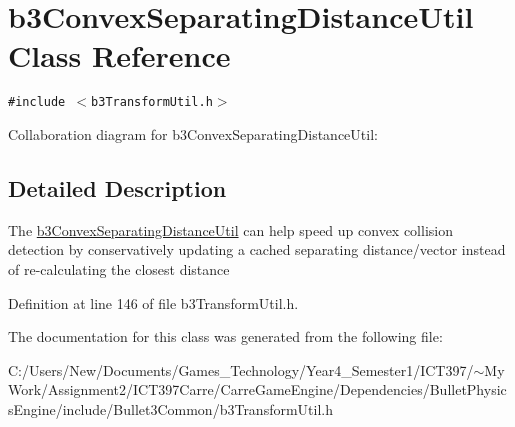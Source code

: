 \hypertarget{classb3_convex_separating_distance_util}{
\section{b3ConvexSeparatingDistanceUtil Class Reference}
\label{classb3_convex_separating_distance_util}
}
{\tt \#include $<$b3TransformUtil.h$>$}

Collaboration diagram for b3ConvexSeparatingDistanceUtil:

\subsection{Detailed Description}
The \hyperlink{classb3_convex_separating_distance_util}{b3ConvexSeparatingDistanceUtil} can help speed up convex collision detection by conservatively updating a cached separating distance/vector instead of re-calculating the closest distance 

Definition at line 146 of file b3TransformUtil.h.

The documentation for this class was generated from the following file:\begin{CompactItemize}
\item 
C:/Users/New/Documents/Games\_\-Technology/Year4\_\-Semester1/ICT397/$\sim$My Work/Assignment2/ICT397Carre/CarreGameEngine/Dependencies/BulletPhysicsEngine/include/Bullet3Common/b3TransformUtil.h\end{CompactItemize}
